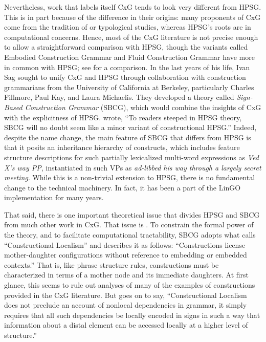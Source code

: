 \documentclass[output=paper
                ,modfonts
                ,nonflat
	        ,collection
	        ,collectionchapter
	        ,collectiontoclongg
 	        ,biblatex
                ,babelshorthands
                ,newtxmath
                ,draftmode
                ,colorlinks, citecolor=brown
]{./langsci/langscibook}
\begin{document}
Nevertheless, work that labels itself CxG tends to look very different from HPSG.  This is in part because of the difference in their origins: many proponents of CxG come from the tradition of  or typological studies, whereas HPSG's roots are in computational concerns. Hence, most of the CxG literature is not precise enough to allow a straightforward comparison with HPSG, though the variants called Embodied Construction Grammar and Fluid Construction Grammar have more in common with HPSG; see \citet{MuellerFCG} for a comparison.  In the last years of his life, Ivan Sag sought to unify CxG and HPSG through collaboration with construction grammarians from the University of California at Berkeley, particularly Charles Fillmore, Paul Kay, and Laura Michaelis.  They developed a theory called \emph{Sign-Based Construction Grammar} (SBCG), which would combine the insights of CxG with the explicitness of HPSG.  \citet[]{Sag2012a} wrote, ``To readers steeped in HPSG theory, SBCG will no doubt seem like a minor variant of constructional HPSG.''  Indeed, despite the name change, the main feature of SBCG that differs from HPSG is that it posits an inheritance hierarchy of constructs, which includes feature structure descriptions for such partially lexicalized multi-word expressions as \emph{Ved X's way PP}, instantiated in such VPs as \textit{ad-libbed his way through a largely secret meeting}.  While this is a non-trivial extension to HPSG, there is no fundamental change to the technical machinery.  In fact, it has been a part of the LinGO implementation for many years.

That said, there is one important theoretical issue that divides HPSG and SBCG from much other work in CxG.  That issue is .  To constrain the formal power of the theory, and to facilitate computational tractability, SBCG adopts what \citet[]{Sag2012a} calls ``Constructional Localism'' and describes it as follows:  ``Constructions license mother-daughter configurations without reference to embedding or embedded contexts.''  That is, like phrase structure rules, constructions must be characterized in terms of a mother node and its immediate daughters.  At first glance, this seems to rule out analyses of many of the examples of constructions provided in the CxG literature.  But  \citet[]{Sag2012a} goes on to say, ``Constructional Localism does not preclude an account of nonlocal dependencies in grammar, it simply requires that all such dependencies be locally encoded in signs in such a way that information about a distal element can be accessed locally at a higher level of structure.''
\end{document}
